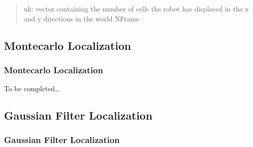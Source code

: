 \documentclass[letterpaper,10pt,english]{sphinxmanual}
\begin{document}
\begin{fulllineitems}
\begin{fulllineitems}
\begin{quote}
\begin{description}
\sphinxAtStartPar
uk: vector containing the number of cells the robot has displaced in the x and y directions in the world N\sphinxhyphen{}Frame

\end{description}\end{quote}

\end{fulllineitems}


\end{fulllineitems}



\subsection{Montecarlo Localization}
\label{\detokenize{Localization_index:montecarlo-localization}}
\sphinxstepscope


\subsubsection{Montecarlo Localization}
\label{\detokenize{MCLLocalization:montecarlo-localization}}\label{\detokenize{MCLLocalization::doc}}
\sphinxAtStartPar
To be completed…


\subsection{Gaussian Filter  Localization}
\label{\detokenize{Localization_index:gaussian-filter-localization}}
\sphinxstepscope


\subsubsection{Gaussian Filter Localization}
\label{\detokenize{GFLocalization:gaussian-filter-localization}}\label{\detokenize{GFLocalization::doc}}
\begin{figure}[htbp]
\centering

\noindent{}
\end{figure}
\end{document}
